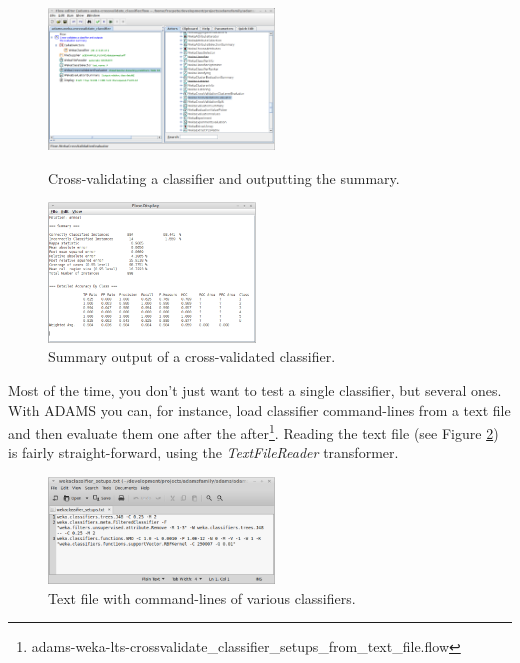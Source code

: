 \begin{figure}[ht]
  \begin{minipage}[t]{0.5\linewidth}
    \centering
    \includegraphics[width=6.0cm]{images/basic-crossvalidate1-flow.png}
    \caption{Cross-validating a classifier and outputting the summary.}
    \label{basic-crossvalidate1-flow}
  \end{minipage}
  \hspace{0.5cm}
  \begin{minipage}[t]{0.5\linewidth}
    \centering
    \includegraphics[width=5.5cm]{images/basic-crossvalidate1-output.png}
    \caption{Summary output of a cross-validated classifier.}
    \label{basic-crossvalidate1-output}
  \end{minipage}
\end{figure}

Most of the time, you don't just want to test a single classifier, but several
ones. With ADAMS you can, for instance, load classifier command-lines from a
text file and then evaluate them one after the
after\footnote{adams-weka-lts-crossvalidate\_classifier\_setups\_from\_text\_file.flow}.
Reading the text file (see Figure
\ref{basic-crossvalidate_multiple_files-setups}) is fairly straight-forward,
using the \textit{TextFileReader} transformer.

\begin{figure}[htb]
  \centering
  \includegraphics[width=6.0cm]{images/basic-crossvalidate_multiple_files-setups.png}
  \caption{Text file with command-lines of various classifiers.}
  \label{basic-crossvalidate_multiple_files-setups}
\end{figure}

